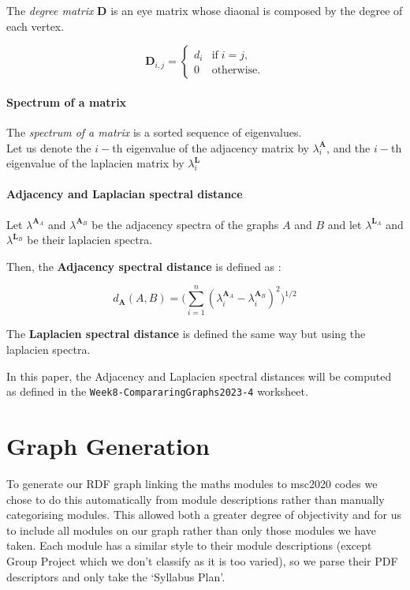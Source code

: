 \documentclass[english, 12pt]{article}
\begin{document}
The {\it degree matrix} $\mathbf D$ is an eye matrix whose diaonal is composed by the degree of each vertex.

$$\mathbf D_{i,j} =  \begin{cases}d_i&\text{if}\; i = j,\\0&\text{otherwise.}\end{cases}$$

\paragraph{Spectrum of a matrix}

The {\it spectrum of a matrix} is a sorted sequence of eigenvalues.\\
Let us denote the $i-$th eigenvalue of the adjacency matrix by $\lambda_i^{\mathbf A}$, and the $i-$th eigenvalue of the laplacien matrix by $\lambda_i^{\mathbf L}$

\paragraph{Adjacency and Laplacian spectral distance}
Let $\lambda^{\mathbf A_A}$ and  $\lambda^{\mathbf A_B}$ be the adjacency spectra of the graphs $A$ and $B$ and let $\lambda^{\mathbf L_A}$ and  $\lambda^{\mathbf L_B}$ be their laplacien spectra.

Then, the {\bf Adjacency spectral distance} is defined as :

$$d_{\mathbf A}(A,B) = \Bigg( \sum_{i=1}^n (\lambda_i^{\mathbf A_A} - \lambda_i^{\mathbf A_B})^2\Bigg)^{1/2}$$

The {\bf Laplacien spectral distance} is defined the same way but using the laplacien spectra.

In this paper, the Adjacency and Laplacien spectral distances will be computed as defined in the \texttt{Week8-CompararingGraphs2023-4} worksheet.

\section{Graph Generation}
To generate our RDF graph linking the maths modules to msc2020\cite{msc_2010} codes we chose to do this automatically from module descriptions rather than manually categorising modules. This allowed both a greater degree of objectivity and for us to include all modules on our graph rather than only those modules we have taken. Each module has a similar style to their module descriptions (except Group Project which we don't classify as it is too varied), so we parse their PDF descriptors and only take the `Syllabus Plan'.
\end{document}
